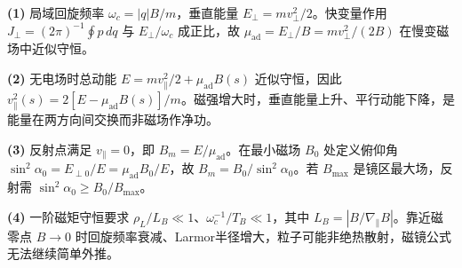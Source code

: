 \par\noindent\textbf{(1)} 局域回旋频率 \(\omega_c=|q|B/m\)，垂直能量 \(E_\perp=mv_\perp^2/2\)。快变量作用 \(J_\perp=(2\pi)^{-1}\oint p\,dq\) 与 \(E_\perp/\omega_c\) 成正比，故 \(\mu_{\mathrm{ad}}=E_\perp/B=mv_\perp^2/(2B)\) 在慢变磁场中近似守恒。
\par\noindent\textbf{(2)} 无电场时总动能 \(E=mv_\parallel^2/2+\mu_{\mathrm{ad}}B(s)\) 近似守恒，因此 \(v_\parallel^2(s)=2[E-\mu_{\mathrm{ad}}B(s)]/m\)。磁强增大时，垂直能量上升、平行动能下降，是能量在两方向间交换而非磁场作净功。
\par\noindent\textbf{(3)} 反射点满足 \(v_\parallel=0\)，即 \(B_m=E/\mu_{\mathrm{ad}}\)。在最小磁场 \(B_0\) 处定义俯仰角 \(\sin^2\alpha_0=E_{\perp0}/E=\mu_{\mathrm{ad}}B_0/E\)，故 \(B_m=B_0/\sin^2\alpha_0\)。若 \(B_{\max}\) 是镜区最大场，反射需 \(\sin^2\alpha_0\ge B_0/B_{\max}\)。
\par\noindent\textbf{(4)} 一阶磁矩守恒要求 \(\rho_L/L_B\ll1\)、\(\omega_c^{-1}/T_B\ll1\)，其中 \(L_B=|B/\nabla_\parallel B|\)。靠近磁零点 \(B\to0\) 时回旋频率衰减、Larmor半径增大，粒子可能非绝热散射，磁镜公式无法继续简单外推。
